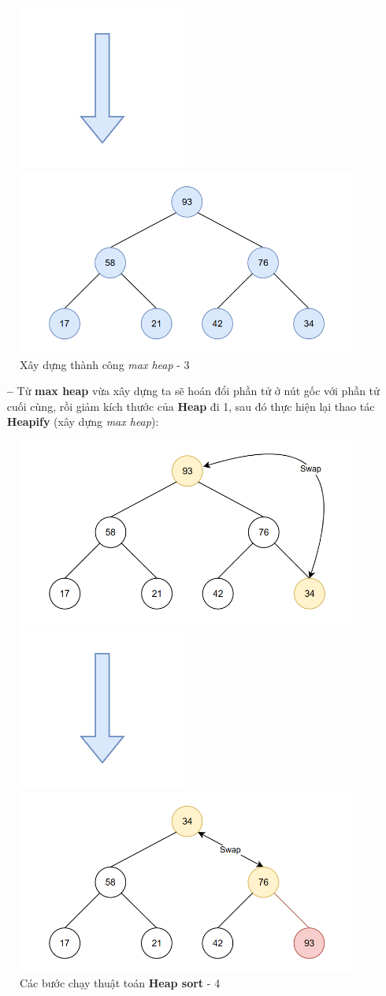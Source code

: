 \begin{figure}[H]
    \centering
    \includegraphics[width=0.1\linewidth]{img/heap_sort/arrow.png}
    \vspace{0.01cm}

    \includegraphics[width=0.5\linewidth]{img/heap_sort/7.png}

    \caption{Xây dựng thành công \textit{max heap} - 3}
\end{figure}

\begin{itemize}
    \item [\textbf{--}] Từ \textbf{max heap} vừa xây dựng ta sẽ hoán đổi phần tử ở nút gốc với phần tử cuối cùng, rồi giảm kích thước của \textbf{Heap} đi 1, sau đó thực hiện lại thao tác \textbf{Heapify} (xây dựng \textit{max heap}):
\end{itemize}

\begin{figure}[H]
    \centering
    \includegraphics[width=0.5\linewidth]{img/heap_sort/8.png}
    \vspace{0.01cm}

    \includegraphics[width=0.1\linewidth]{img/heap_sort/arrow.png}
    \vspace{0.01cm}

    \includegraphics[width=0.5\linewidth]{img/heap_sort/9.png}

    \caption{Các bước chạy thuật toán \textbf{Heap sort} - 4}
\end{figure}

